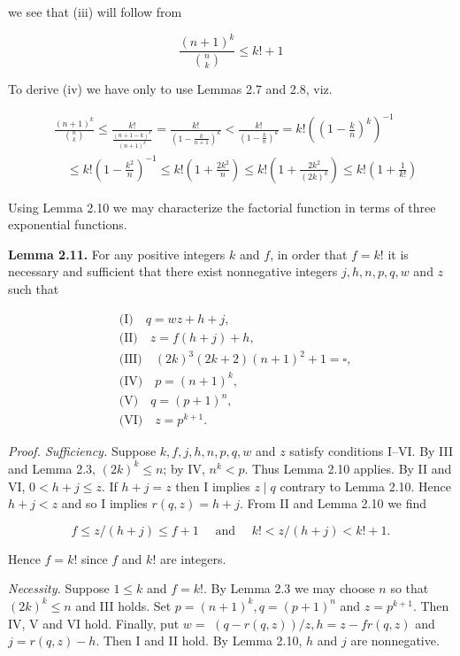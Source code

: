 \documentclass[10pt,letterpaper]{article}
\newcommand{\origpage}[1]{\marginnote{\footnotesize\textbf{[#1]}}}
\newcommand{\statement}[1]{\par\medskip\noindent\textbf{#1}\enspace}
\begin{document}
we see that (iii) will follow from


\begin{equation*}
\frac{(n+1)^{k}}{\binom{n}{k}} \leq k!+1 \tag{iv}
\end{equation*}


To derive (iv) we have only to use Lemmas 2.7 and 2.8, viz.

\[
\begin{aligned}
& \frac{(n+1)^{k}}{\binom{n}{k}}\leq\frac{k!}{\frac{(n+1-k)^{k}}{(n+1)^{k}}}=\frac{k!}{\left(1-\frac{k}{n+1}\right)^{k}}<\frac{k!}{\left(1-\frac{k}{n}\right)^{k}}=k!\left(\left(1-\frac{k}{n}\right)^{k}\right)^{-1} \\
& \quad \leq k!\left(1-\frac{k^{2}}{n}\right)^{-1} \leq k!\left(1+\frac{2 k^{2}}{n}\right) \leq k!\left(1+\frac{2 k^{2}}{(2 k)^{k}}\right) \leq k!\left(1+\frac{1}{k!}\right)
\end{aligned}
\]

\origpage{454}Using Lemma 2.10 we may characterize the factorial function in terms of three exponential functions.

\statement{Lemma 2.11.} For any positive integers $k$ and $f$, in order that $f=k!$ it is necessary and sufficient that there exist nonnegative integers $j, h, n, p, q, w$ and $z$ such that

\begin{align*}
&\text{(I)}\quad q=w z+h+j,\\
&\text{(II)}\quad z=f(h+j)+h,\\
&\text{(III)}\quad (2 k)^{3}(2 k+2)(n+1)^{2}+1=\square,\\
&\text{(IV)}\quad p=(n+1)^{k},\\
&\text{(V)}\quad q=(p+1)^{n},\\
&\text{(VI)}\quad z=p^{k+1}.
\end{align*}

\textit{Proof. Sufficiency.} Suppose $k, f, j, h, n, p, q, w$ and $z$ satisfy conditions I--VI. By III and Lemma 2.3, $(2k)^k\leq n$; by IV, $n^k<p$. Thus Lemma 2.10 applies. By II and VI, $0<h+j\leq z$. If $h+j=z$ then I implies $z \mid q$ contrary to Lemma 2.10. Hence $h+j<z$ and so I implies $r(q, z)=h+j$. From II and Lemma 2.10 we find

\[
f \leq z /(h+j) \leq f+1 \quad \text { and } \quad k!<z /(h+j)<k!+1 .
\]

Hence $f=k!$ since $f$ and $k!$ are integers.

\textit{Necessity.} Suppose $1 \leq k$ and $f=k!$. By Lemma 2.3 we may choose $n$ so that $(2 k)^{k} \leq n$ and III holds. Set $p=(n+1)^{k}, q=(p+1)^{n}$ and $z=p^{k+1}$. Then IV, V and VI hold. Finally, put $w=$ $(q-r(q, z)) / z, h=z-f r(q, z)$ and $j=r(q, z)-h$. Then I and II hold. By Lemma 2.10, $h$ and $j$ are nonnegative.
\end{document}
